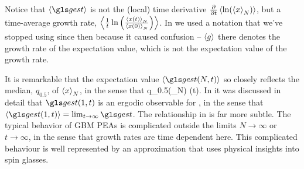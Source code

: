 Notice that $\ave{\gest}$ is not the (local)
time derivative $\frac{\partial}{\partial t}\left\langle\ln(\left\langle x \right\rangle_N) \right\rangle$, but a time-average growth rate, $\left\langle\frac{1}{t}\ln\left( \frac{\left\langle x(t) \right\rangle_N}{\left\langle x(0) \right\rangle_N}\right) \right\rangle$. 
In \cite{PetersKlein2013} we used a notation that we've stopped using since then because it
caused confusion -- $\left\langle g \right\rangle$ there denotes the growth rate of the expectation value, which 
is not the expectation value of the growth rate. 

It is remarkable that the expectation value $\ave{\gest(N,t)}$ so closely reflects the
median, $q_{0.5}$, of $\left\langle x \right\rangle_N$, in the sense that
\be
q_{0.5}(_N) \approx \exp \left(t\right).
\ee
In \cite{PetersGell-Mann2016} it was discussed in detail that 
$\gest(1,t)$ is an ergodic observable for , in the sense that 
$\ave{\gest(1,t)}=\lim_{t\to\infty} \gest$. The relationship in 
is far more subtle. The typical behavior of GBM PEAs 
is complicated outside the limits $N\to\infty$ or $t\to\infty$, in the sense that growth rates are 
time dependent here. This complicated behaviour is well represented by an 
approximation that uses physical insights into spin glasses.


